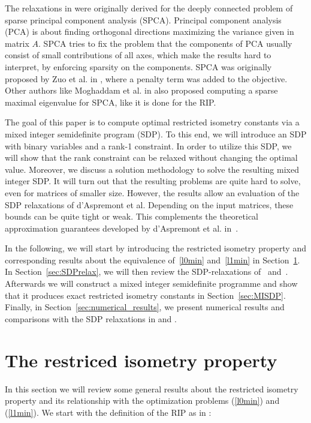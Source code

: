 \documentclass[a4paper,11pt,1p]{elsarticle}
\begin{document}
The relaxations in \cite{Asp07,Asp08} were originally derived for the deeply
connected problem of sparse principal component analysis (SPCA). Principal
component analysis (PCA) is about finding orthogonal directions maximizing the 
variance given in matrix $A$. SPCA tries to fix the problem that the components
of PCA usually consist of small contributions of all axes, which make the results
hard to interpret, by enforcing sparsity on the components. SPCA was
originally proposed by Zuo et al. in \cite{SPCA}, where a penalty term was added 
to the objective. Other authors like Moghaddam et al. in \cite{sbSPCA} also proposed 
computing a sparse maximal eigenvalue for SPCA, like it is done for the RIP.

The goal of this paper is to compute optimal restricted isometry constants
via a mixed integer semidefinite program (SDP). To this end, we will
introduce an SDP with binary variables and a rank-1 constraint. In order to
utilize this SDP, we will show that the rank constraint can be relaxed
without changing the optimal value. Moreover, we discuss a solution
methodology to solve the resulting mixed integer SDP. It will turn out that
the resulting problems are quite hard to solve, even for matrices of
smaller size. However, the results allow an evaluation of the SDP
relaxations of d'Aspremont et al. Depending on the input matrices, these
bounds can be quite tight or weak. This complements the theoretical
approximation guarantees developed by d'Aspremont et
al. in~\cite{AspBG14}.

In the following, we will start by introducing the restricted isometry
property and corresponding results about the equivalence of~\eqref{l0min}
and~\eqref{l1min} in Section~\ref{sec:RIP}. In Section~\ref{sec:SDPrelax},
we will then review the SDP-relaxations of~\cite{Asp07}
and~\cite{Asp08}. Afterwards we will construct a mixed integer semidefinite
programme and show that it produces exact restricted isometry constants in
Section~\ref{sec:MISDP}. Finally, in Section~\ref{sec:numerical_results},
we present numerical results and comparisons with the SDP relaxations in
\cite{Asp07} and \cite{Asp08}.

\section{The restriced isometry property}
\label{sec:RIP}

In this section we will review some general results about the restricted
isometry property and its relationship with the optimization problems
(\ref{l0min}) and (\ref{l1min}). We start with the definition of the RIP as
in \cite{CT05}:
\end{document}
